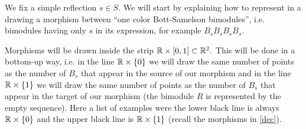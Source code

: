 \documentclass[12pt]{wart}
\theoremstyle{remark}
\begin{document}
We fix a simple reflection $s\in S.$  We will start by explaining how to represent  in a drawing a morphism between ``one color Bott-Samelson bimodules'', i.e. bimodules having only $s$ in its expression, for example $B_sB_sB_sB_s.$ 

Morphisms will be drawn inside the strip $\mathbb R \times [0,1]\subset \mathbb R^2.$ This will be done in a bottom-up way, i.e. in the line $\mathbb R \times \{0\}$ we will draw the same number of points as the number of $B_s$ that appear in the source of our morphism and in the line $\mathbb R \times \{1\}$ we will draw the same number of points as the number of $B_s$ that appear in the target of our morphism (the bimodule $R$ is represented by the empty sequence). Here a list of examples were the lower black line is always $\mathbb R \times \{0\}$ and the upper black line is $\mathbb R \times \{1\}$ (recall the morphisms in \ref{dec}).
\end{document}

